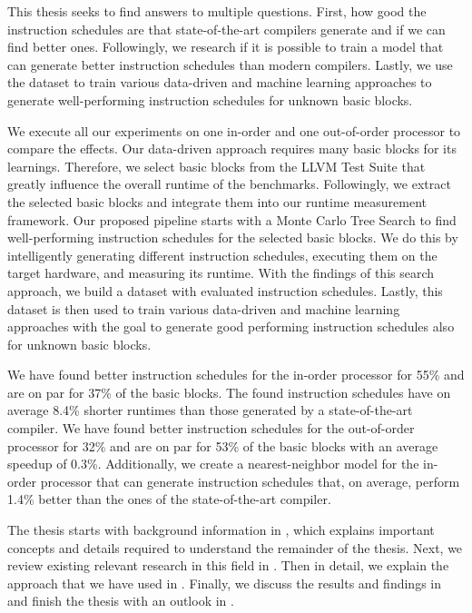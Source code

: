 This thesis seeks to find answers to multiple questions.
First, how good the instruction schedules are that state-of-the-art compilers generate and if we can find better ones.
Followingly, we research if it is possible to train a model that can generate better instruction schedules than modern compilers.
Lastly, we use the dataset to train various data-driven and machine learning approaches to generate well-performing instruction schedules for unknown basic blocks.


We execute all our experiments on one in-order and one out-of-order processor to compare the effects.
Our data-driven approach requires many basic blocks for its learnings.
Therefore, we select basic blocks from the LLVM Test Suite that greatly influence the overall runtime of the benchmarks.
Followingly, we extract the selected basic blocks and integrate them into our runtime measurement framework.
Our proposed pipeline starts with a Monte Carlo Tree Search to find well-performing instruction schedules for the selected basic blocks.
We do this by intelligently generating different instruction schedules, executing them on the target hardware, and measuring its runtime.
With the findings of this search approach, we build a dataset with evaluated instruction schedules.
Lastly, this dataset is then used to train various data-driven and machine learning approaches with the goal to generate good performing instruction schedules also for unknown basic blocks.

We have found better instruction schedules for the in-order processor for 55\% and are on par for 37\% of the basic blocks.
The found instruction schedules have on average 8.4\% shorter runtimes than those generated by a state-of-the-art compiler.
We have found better instruction schedules for the out-of-order processor for 32\% and are on par for 53\% of the basic blocks with an average speedup of 0.3\%.
Additionally, we create a nearest-neighbor model for the in-order processor that can generate instruction schedules that, on average, perform 1.4\% better than the ones of the state-of-the-art compiler.

The thesis starts with background information in , which explains important concepts and details required to understand the remainder of the thesis.
Next, we review existing relevant research in this field in .
Then in detail, we explain the approach that we have used in .
Finally, we discuss the results and findings in  and finish the thesis with an outlook in .





